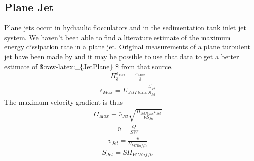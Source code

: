 \documentclass[letterpaper,10pt,english]{sphinxmanual}
\begin{document}
\subsection{Plane Jet}
\label{\detokenize{Rapid_Mix/RM_Derivations:plane-jet}}\label{\detokenize{Rapid_Mix/RM_Derivations:heading-plane-jet}}
Plane jets occur in hydraulic flocculators and in the sedimentation tank inlet jet system. We haven’t been able to find a literature estimate of the maximum energy dissipation rate in a plane jet. Original measurements of a plane turbulent jet have been made by  and it may be possible to use that data to get a better estimate of \$:raw-latex:\_\{JetPlane\} \$ from that source.
\begin{equation}\label{equation:Rapid_Mix/RM_Derivations:Rapid_Mix/RM_Derivations:120}
\begin{split}\Pi_{\bar \epsilon}^{\epsilon_{Max}} = \frac{\varepsilon_{Max}}{\bar \varepsilon}\end{split}
\end{equation}\begin{equation}\label{equation:Rapid_Mix/RM_Derivations:Rapid_Mix/RM_Derivations:121}
\begin{split}\varepsilon_{Max} = \Pi_{JetPlane}  \frac{  \bar v_{Jet} ^3}{S_{Jet}}\end{split}
\end{equation}
The maximum velocity gradient is thus
\begin{equation}\label{equation:Rapid_Mix/RM_Derivations:Rapid_Mix/RM_Derivations:122}
\begin{split}G_{Max} = \bar v_{Jet}\sqrt{\frac{\Pi_{JetPlane} \bar v_{Jet}}{\nu S_{Jet}}}\end{split}
\end{equation}\begin{equation}\label{equation:Rapid_Mix/RM_Derivations:Rapid_Mix/RM_Derivations:123}
\begin{split}\bar v = \frac{Q}{SW}\end{split}
\end{equation}\begin{equation}\label{equation:Rapid_Mix/RM_Derivations:Rapid_Mix/RM_Derivations:124}
\begin{split}\bar v_{Jet} = \frac{\bar v}{\Pi_{VCBaffle}}\end{split}
\end{equation}\begin{equation}\label{equation:Rapid_Mix/RM_Derivations:Rapid_Mix/RM_Derivations:125}
\begin{split}S_{Jet} = S \Pi_{VCBaffle}\end{split}
\end{equation}
\end{document}
